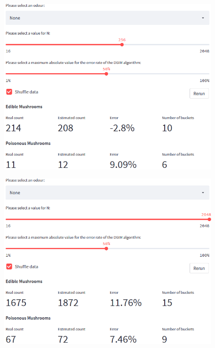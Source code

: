 \begin{frame}{}
	\begin{figure}
		\includegraphics[height=.75\linewidth]{images/typical2.png}
	\end{figure}
\end{frame}

\begin{frame}{}
	\begin{figure}
		\includegraphics[height=.75\linewidth]{images/big_n.png}
	\end{figure}
\end{frame}


